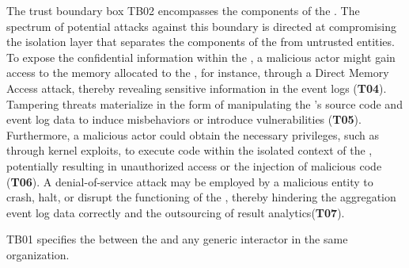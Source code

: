 \begin{newj}
The trust boundary box TB02 encompasses the components of the . The spectrum of potential attacks against this boundary is directed at compromising the isolation layer that separates the components of the  from untrusted entities. To expose the confidential information within the , a malicious actor might gain access to the memory allocated to the , for instance, through a Direct Memory Access attack, thereby revealing sensitive information in the event logs (\textbf{T04}). Tampering threats materialize in the form of manipulating the 's source code and event log data to induce misbehaviors or introduce vulnerabilities (\textbf{T05}). Furthermore, a malicious actor could obtain the necessary privileges, such as through kernel exploits, to execute code within the isolated context of the , potentially resulting in unauthorized access or the injection of malicious code (\textbf{T06}). A denial-of-service attack may be employed by a malicious entity to crash, halt, or disrupt the functioning of the , thereby hindering the aggregation event log data correctly and the outsourcing of result analytics(\textbf{T07}). 

TB01 specifies the between the  and any generic interactor in the same organization. 

\end{newj}


